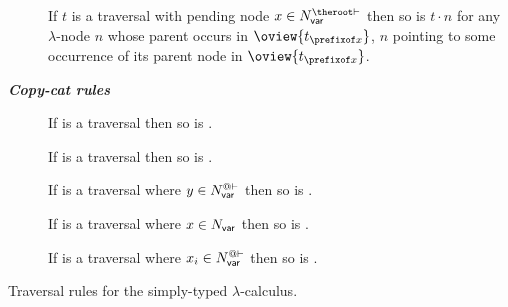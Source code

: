 \begin{FramedTable}
\begin{description}
\item[] If $t$ is a traversal with pending node  $x \in N_{\sf var}^{\theroot\vdash}$ then so is $t \cdot n$ for any $\lambda$-node $n$ whose parent occurs in  $\oview{t_{\prefixof x}}$, $n$ pointing to some occurrence of its  parent node in $\oview{t_{\prefixof x}}$.
\end{description}

\emph{\bf Copy-cat rules}
\begin{description}
\item[]
  If 
is a traversal then so is .

\item[] If 
is a traversal then so is .

\item[] If  is a
traversal where $y\in N_{\sf var}^{@\vdash}$ then so is .

\item[] If 
is a traversal where $x\in N_{\sf var}$ then so is .
\end{description}

\begin{description}
\item[]
If  is a traversal where
    $x_i \in N_{\sf var}^{@\vdash}$ then
so is .
\end{description}
\caption[Traversal rules for the simply-typed
lambda-calculus]{Traversal rules for the simply-typed
$\lambda$-calculus.} \label{tab:trav_rules}
\end{FramedTable}

